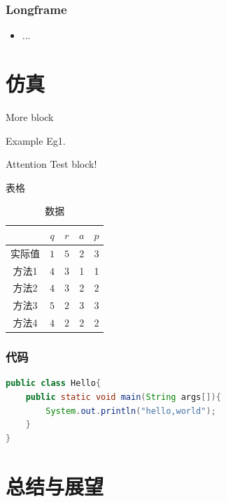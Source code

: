 \documentclass[hyperref,UTF8,11pt,aspectratio=169]{beamer}
\begin{document}
\begin{frame}[allowframebreaks]
    \frametitle{Longframe}
    \begin{itemize}
        \item ...
    \end{itemize}
\end{frame}

\section{仿真}

\begin{frame}{More block}
    \begin{exampleblock}{Example}
    Eg1.
    \end{exampleblock}
    \begin{alertblock}{Attention}
        Test block!
    \end{alertblock}
\end{frame}

\begin{frame}{表格}
    \begin{table}[]
        \centering
        \caption{数据}
        \label{tab1}
        \begin{tabular}{@{}ccccc@{}}
        \toprule
				    & $q$		& $r$		& $a$ 		& $p$		\\ \midrule
        实际值      & $1$		& $5$		& 2   		& 3			\\
        方法1       & $4$		& $3$		& 1 		& 1			\\
        方法2       & $4$		& $3$		& 2 		& 2			\\
        方法3       & $5$ 		& $2$		& 3 		& 3			\\
        方法4       & $4$		& $2$		& 2 		& 2			\\ \bottomrule
        \end{tabular}
    \end{table}
\end{frame}

\begin{frame}[fragile]
    \frametitle{代码}
    \begin{lstlisting}[language=java]
public class Hello{
    public static void main(String args[]){
        System.out.println("hello,world");
    }
}\end{lstlisting}
\end{frame}

\section{总结与展望}
\end{document}
